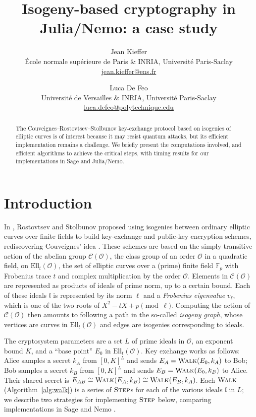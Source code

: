 \documentclass[12pt]{article}
\newcommand{\F}{\mathbb{F}}
\renewcommand{\O}{\mathcal{O}}
\newcommand{\Ell}{\mathrm{Ell}}
\newcommand{\Cl}{\mathcal{C}}
\newcommand{\frakell}{\mathfrak{l}}
\newcommand{\Walk}{\textsc{Walk}}
\newcommand{\Step}{\textsc{Step}}
\begin{document}
\title{Isogeny-based cryptography in Julia/Nemo: a case study}

\author{Jean Kieffer \\
\'Ecole normale sup\'erieure de Paris \& INRIA, Universit\'e Paris-Saclay \\
\url{jean.kieffer@ens.fr}
\and
Luca De Feo \\
Universit\'e de Versailles \& INRIA, Universit\'e Paris-Saclay \\
\url{luca.defeo@polytechnique.edu}}

\maketitle

\begin{abstract}
The Couveignes--Rostovtsev--Stolbunov key-exchange protocol based on
    isogenies of elliptic curves is of interest because it may resist
    quantum attacks, but its efficient implementation remains a challenge.
    We briefly present the computations involved, and efficient
    algorithms to achieve the critical steps, with timing results for our implementations in Sage and Julia/Nemo.
\end{abstract}

\section{Introduction}
\label{sec:intro}

In \cite{RS}, Rostovtsev and Stolbunov proposed using isogenies between
ordinary elliptic curves over finite fields to build key-exchange and
public-key encryption schemes, rediscovering Couveignes' idea
\cite{Couveignes}. These schemes are based on the simply transitive action
of the abelian group $\Cl(\O)$, the class group of an order \(\O\) in a
quadratic field, on $\Ell_t(\O)$, the set of elliptic curves over a
(prime) finite field $\F_p$ with Frobenius trace $t$ and complex
multiplication by the order $\O$. Elements in $\Cl(\O)$ are represented
as products of ideals of prime norm, up to a certain bound. 
Each of these ideals \(\frakell\) is represented by its norm \(\ell\) and a
\emph{Frobenius eigenvalue} \(v_\ell\),
which is one of the two roots of \(X^2 - tX + p \pmod{\ell}\).
Computing the action of \(\Cl(\O)\) then amounts to following a path in
the so-called \emph{isogeny graph}, whose vertices are curves in $\Ell_t(\O)$ and edges are isogenies corresponding to ideals. 

The cryptosystem parameters are
a set \(L\) of prime ideals in \(\O\),
an exponent bound \(K\),
and a ``base point'' \(E_0\) in \(\Ell_t(\O)\).
Key exchange works as follows:
Alice samples a secret \(k_A\) from \([0,K]^L\)
and sends \(E_A = \Walk(E_0,k_A)\) to Bob;
Bob samples a secret \(k_B\) from \([0,K]^L\)
and sends \(E_B = \Walk(E_0,k_B)\) to Alice.
Their shared secret is \(E_{AB} \cong \Walk(E_A,k_B) \cong \Walk(E_B,k_A)\).
Each \(\Walk\) (Algorithm~\ref{alg:walk})
is a series of \(\Step\)s
for each of the various ideals \(\frakell\) in \(L\);
we describe two strategies for implementing \(\Step\) below,
comparing implementations in Sage \cite{Sage} and Nemo \cite{Nemo}. 
\end{document}
